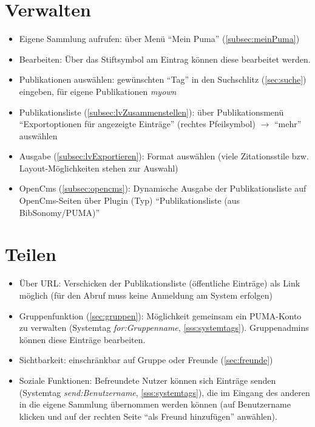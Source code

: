 \section{Verwalten}
\label{sec:verwalten}
\begin{itemize}
\item Eigene Sammlung aufrufen: über Menü \enquote{Mein Puma} (\autoref{subsec:meinPuma})
\item Bearbeiten: Über das Stiftsymbol am Eintrag können diese bearbeitet werden.
\item Publikationen auswählen: gewünschten \enquote{Tag} in den Suchschlitz (\autoref{sec:suche}) eingeben, für eigene Publikationen \textit{myown}
\item Publikationsliste (\autoref{subsec:lvZusammenstellen}): über Publikationsmenü \enquote{Exportoptionen für angezeigte Einträge}  (rechtes Pfeilsymbol) $\to$ \enquote{mehr} auswählen
\item Ausgabe (\autoref{subsec:lvExportieren}): Format auswählen (viele Zitationsstile bzw. Layout-Möglichkeiten stehen zur Auswahl)
\item OpenCms (\autoref{subsec:opencms}): Dynamische Ausgabe der Publikationsliste auf OpenCms-Seiten über Plugin (Typ) \enquote{Publikationsliste (aus BibSonomy/PUMA)}
\end{itemize}

\section{Teilen}
\label{sec:teilen}
\begin{itemize}
\item Über URL: Verschicken der Publikationsliste (öffentliche Einträge) als Link möglich (für den Abruf muss keine Anmeldung am System erfolgen)
\item Gruppenfunktion (\autoref{sec:gruppen}): Möglichkeit gemeinsam ein PUMA-Konto zu verwalten (Systemtag \textit{for:Gruppenname}, \autoref{sss:systemtags}). Gruppenadmins können diese Einträge bearbeiten.
\item Sichtbarkeit: einschränkbar auf Gruppe oder Freunde (\autoref{sec:freunde})
\item Soziale Funktionen: Befreundete Nutzer können sich Einträge senden (Systemtag \textit{send:Benutzername}, \autoref{sss:systemtags}), die im Eingang des anderen in die eigene Sammlung übernommen werden können (auf Benutzername klicken und auf der rechten Seite \enquote{als Freund hinzufügen} anwählen).
\end{itemize}
\newpage
